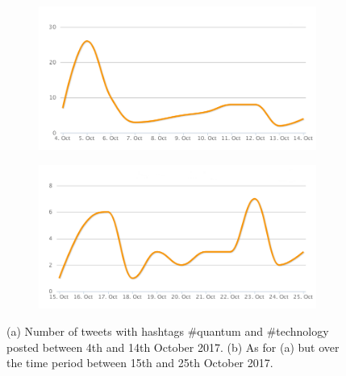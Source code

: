 \begin{figure}
 \centering
 \begin{subfigure}[b]{0.9\textwidth}
   \includegraphics[width=1\linewidth]{Images/FirstSearch_QuantumTechnology.png}
   \caption{} 
 \end{subfigure}

 \begin{subfigure}[b]{0.9\textwidth}
   \includegraphics[width=1\linewidth]{Images/SecondSearch_QuantumTechnology.png}
   \caption{}
 \end{subfigure}
 \caption{(a) Number of tweets with hashtags \#quantum and \#technology posted between 4th and 14th October 2017. (b) As for (a) but over the time period between 15th and 25th October 2017.} 
 \label{First-SecondSearch_QuantumTechnology.png}
\end{figure}